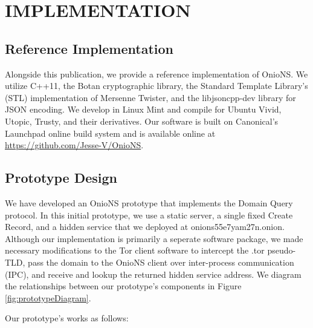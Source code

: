 
\chapter{IMPLEMENTATION}

\section{Reference Implementation}

Alongside this publication, we provide a reference implementation of OnioNS. We utilize C++11, the Botan cryptographic library, the Standard Template Library's (STL) implementation of Mersenne Twister, and the libjsoncpp-dev library for JSON encoding. We develop in Linux Mint and compile for Ubuntu Vivid, Utopic, Trusty, and their derivatives. Our software is built on Canonical's Launchpad online build system and is available online at \url{https://github.com/Jesse-V/OnioNS}. 

\section{Prototype Design}

We have developed an OnioNS prototype that implements the Domain Query protocol. In this initial prototype, we use a static server, a single fixed Create Record, and a hidden service that we deployed at onions55e7yam27n.onion. Although our implementation is primarily a seperate software package, we made necessary modifications to the Tor client software to intercept the .tor pseudo-TLD, pass the domain to the OnioNS client over inter-process communication (IPC), and receive and lookup the returned hidden service address. We diagram the relationships between our prototype's components in Figure \ref{fig:prototypeDiagram}.

Our prototype's works as follows:

